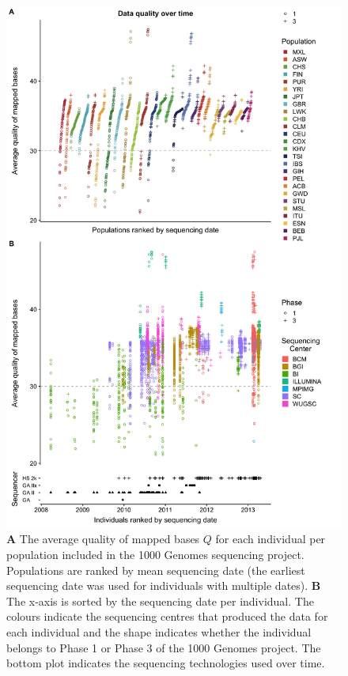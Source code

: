 \documentclass[9pt,lineno]{elife}
\begin{document}
\begin{figure}
\includegraphics[width=0.95\hsize,keepaspectratio]{./Figures/MapQualOverTime.jpg}

\caption{\textbf{A} The average quality of mapped bases $Q$ for each individual per population included in the 1000 Genomes sequencing project. 
 Populations are ranked by mean sequencing date (the earliest sequencing date was used for individuals with multiple dates). 
 \textbf{B} The x-axis is sorted by the sequencing date per individual. 
The colours indicate the sequencing centres that produced the data for each individual and the shape indicates whether the individual belongs to Phase 1 or Phase 3 of the 1000 Genomes project. 
The bottom plot indicates the sequencing technologies used over time.}
\label{MapQual}
\end{figure}
\end{document}
